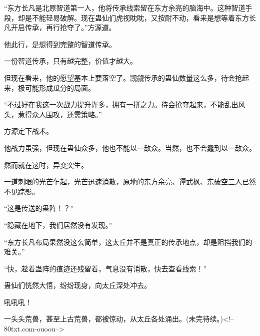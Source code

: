 \begin{this_body}
“东方长凡是北原智道第一人，他将传承线索留在东方余亮的脑海中。这种智道手段，却是不能轻易破解。现在蛊仙们虎视眈眈，又按耐不动，看来是想等着东方长凡开启传承，再行抢夺了。”方源道。

他此行，是想得到完整的智道传承。

一份智道传承，只有越完整，价值才越大。

但现在看来，他的愿望基本上要落空了。觊觎传承的蛊仙数量这么多，待会抢起来，极可能形成瓜分的局面。

“不过好在我这一次战力提升许多，拥有一拼之力。待会抢夺起来，不能乱出风头，惹得众人围攻，还需策略。”

方源定下战术。

他战力虽强，但现在蛊仙众多，他也不能以一敌众。当然，也不会蠢到以一敌众。

然而就在这时，异变突生。

一道刺眼的光芒乍起，光芒迅速消散，原地的东方余亮、谭武枫、东破空三人已然不见踪影。

“这是传送的蛊阵！？”

“隐藏在地下，我们居然没有发现。”

“东方长凡布局果然没这么简单，这太丘并不是真正的传承地点，却是阻挡我们的难关。”

“快，趁着蛊阵的痕迹还残留着，气息没有消散，快去查看线索！”

蛊仙们恍然大悟，纷纷现身，向太丘深处冲去。

吼吼吼！

一头头荒兽，甚至上古荒兽，都被惊动，从太丘各处涌出。(未完待续。)<!--80txt.com-ouoou-->

\end{this_body}

